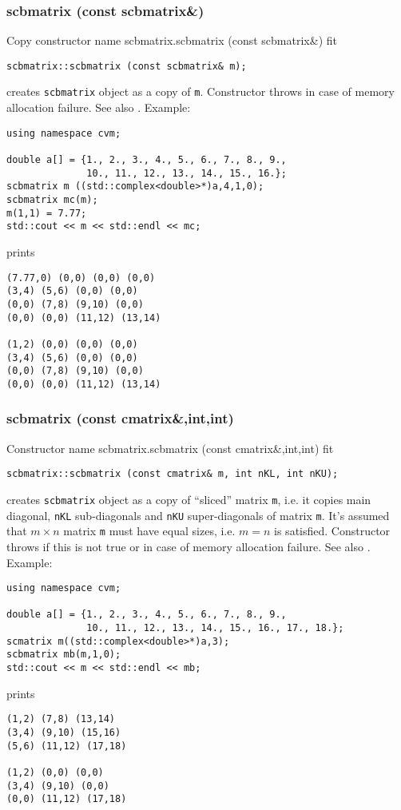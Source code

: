 \subsubsection{scbmatrix (const scbmatrix\&)}
Copy constructor%
\pdfdest name {scbmatrix.scbmatrix (const scbmatrix&)} fit
\begin{verbatim}
scbmatrix::scbmatrix (const scbmatrix& m);
\end{verbatim}
creates  \verb"scbmatrix" object as a copy of \verb"m".
Constructor throws  
in case of memory allocation failure.
See also .
Example:
\begin{Verbatim}
using namespace cvm;

double a[] = {1., 2., 3., 4., 5., 6., 7., 8., 9.,
              10., 11., 12., 13., 14., 15., 16.};
scbmatrix m ((std::complex<double>*)a,4,1,0);
scbmatrix mc(m);
m(1,1) = 7.77;
std::cout << m << std::endl << mc;
\end{Verbatim}
prints
\begin{Verbatim}
(7.77,0) (0,0) (0,0) (0,0)
(3,4) (5,6) (0,0) (0,0)
(0,0) (7,8) (9,10) (0,0)
(0,0) (0,0) (11,12) (13,14)

(1,2) (0,0) (0,0) (0,0)
(3,4) (5,6) (0,0) (0,0)
(0,0) (7,8) (9,10) (0,0)
(0,0) (0,0) (11,12) (13,14)
\end{Verbatim}
\newpage




\subsubsection{scbmatrix (const cmatrix\&,int,int)}
Constructor%
\pdfdest name {scbmatrix.scbmatrix (const cmatrix&,int,int)} fit
\begin{verbatim}
scbmatrix::scbmatrix (const cmatrix& m, int nKL, int nKU);
\end{verbatim}
creates  \verb"scbmatrix" object as a copy of ``sliced'' 
matrix \verb"m", i.e. it copies main diagonal, \verb"nKL" 
sub-diagonals and \verb"nKU" super-diagonals of  matrix \verb"m".
It's assumed that $m\times n$ matrix \verb"m" must have equal
sizes, i.e. $m = n$ is satisfied.
Constructor throws  
if this is not true or in case of memory allocation failure.
See also .
Example:
\begin{Verbatim}
using namespace cvm;

double a[] = {1., 2., 3., 4., 5., 6., 7., 8., 9.,
              10., 11., 12., 13., 14., 15., 16., 17., 18.};
scmatrix m((std::complex<double>*)a,3);
scbmatrix mb(m,1,0);
std::cout << m << std::endl << mb;
\end{Verbatim}
prints
\begin{Verbatim}
(1,2) (7,8) (13,14)
(3,4) (9,10) (15,16)
(5,6) (11,12) (17,18)

(1,2) (0,0) (0,0)
(3,4) (9,10) (0,0)
(0,0) (11,12) (17,18)
\end{Verbatim}
\newpage




